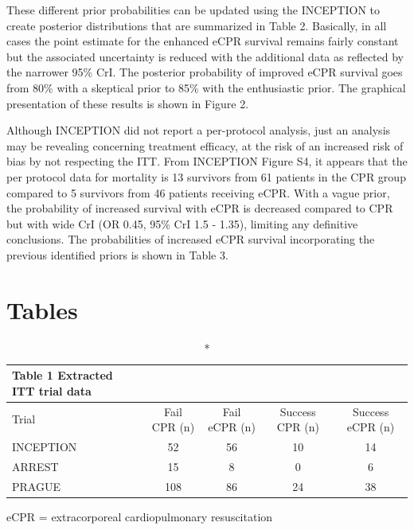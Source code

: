 \documentclass[
  super,
  preprint,
  3p]{elsarticle}
\begin{document}
These different prior probabilities can be updated using the INCEPTION
to create posterior distributions that are summarized in Table 2.
Basically, in all cases the point estimate for the enhanced eCPR
survival remains fairly constant but the associated uncertainty is
reduced with the additional data as reflected by the narrower 95\% CrI.
The posterior probability of improved eCPR survival goes from 80\% with
a skeptical prior to 85\% with the enthusiastic prior. The graphical
presentation of these results is shown in Figure 2.

Although INCEPTION did not report a per-protocol analysis, just an
analysis may be revealing concerning treatment efficacy, at the risk of
an increased risk of bias by not respecting the ITT. From INCEPTION
Figure S4\citep{CPR2023a}, it appears that the per protocol data for
mortality is 13 survivors from 61 patients in the CPR group compared to
5 survivors from 46 patients receiving eCPR. With a vague prior, the
probability of increased survival with eCPR is decreased compared to CPR
but with wide CrI (OR 0.45, 95\% CrI 1.5 - 1.35), limiting any
definitive conclusions. The probabilities of increased eCPR survival
incorporating the previous identified priors is shown in Table 3.

\newpage

\hypertarget{tables}{%
\section{Tables}\label{tables}}

\setlength{\LTpost}{0mm}
\begin{longtable}{lcccc}
\caption*{
{\large Table 1 Extracted ITT trial data}
} \\ 
\toprule
Trial & Fail CPR (n) & Fail eCPR (n) & Success CPR (n) & Success eCPR (n) \\ 
\midrule
INCEPTION & 52 & 56 & 10 & 14 \\ 
ARREST & 15 & 8 & 0 & 6 \\ 
PRAGUE & 108 & 86 & 24 & 38 \\ 
\bottomrule
\end{longtable}
\begin{minipage}{\linewidth}
eCPR = extracorporeal cardiopulmonary resuscitation\\
\end{minipage}
\end{document}
